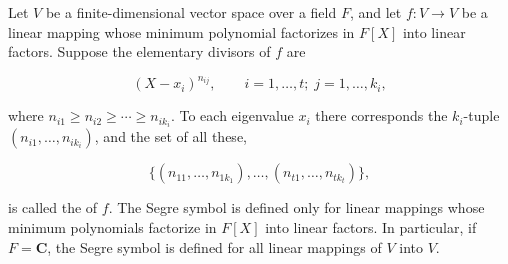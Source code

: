 Let $V$ be a finite-dimensional vector space over a field $F$, and let $f \colon V \to V$ be a linear mapping whose minimum polynomial factorizes in $F[X]$ into linear factors. Suppose the elementary divisors of $f$ are

$$(X - x_i)^{n_{ij}}, \qquad i = 1, \ldots, t;\; j = 1, \ldots, k_i,$$

where $n_{i1} \geq n_{i2} \geq \cdots \geq n_{ik_i}$. To each eigenvalue $x_i$ there corresponds the $k_i$-tuple $(n_{i1}, \ldots, n_{ik_i})$, and the set of all these,

$$\{(n_{11}, \ldots, n_{1k_1}), \ldots, (n_{t1}, \ldots, n_{tk_t})\},$$

is called the  of $f$. The Segre symbol is defined only for linear mappings whose minimum polynomials factorize in $F[X]$ into linear factors. In particular, if $F = \mathbf{C}$, the Segre symbol is defined for all linear mappings of $V$ into $V$.

